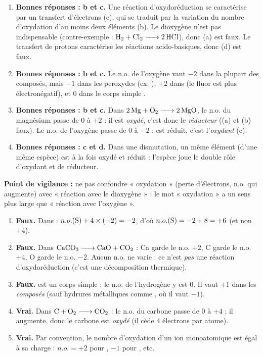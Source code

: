 \documentclass[11pt]{article}
\newcommand{\cle}[1]{{\popxbold\color{popdark}#1}}
\begin{document}
\begin{corrige}
\begin{enumerate}
\item \textbf{Bonnes réponses : b et c.} Une réaction d'oxydoréduction se caractérise par un \cle{transfert d'électrons} (c), qui se traduit par la variation du nombre d'oxydation d'au moins deux éléments (b). Le dioxygène n'est pas indispensable (contre-exemple : $\ce{H2 + Cl2 -> 2 HCl}$), donc (a) est faux. Le transfert de protons  caractérise les réactions acido-basiques, donc (d) est faux.
\item \textbf{Bonnes réponses : b et c.} Le n.o. de l'oxygène vaut $-2$ dans la plupart des composés, mais $-1$ dans les peroxydes (ex. ), $+2$ dans  (le fluor est plus électronégatif), et $0$ dans le corps simple .
\item \textbf{Bonnes réponses : b et c.} Dans $\ce{2 Mg + O2 -> 2 MgO}$, le n.o. du magnésium passe de $0$ à $+2$ : il est \emph{oxydé}, c'est donc le \emph{réducteur} ((a) et (b) faux). Le n.o. de l'oxygène passe de $0$ à $-2$ :  est réduit, c'est l'\emph{oxydant} (c).
\item \textbf{Bonnes réponses : c et d.} Dans une \cle{dismutation}, un même élément (d'une même espèce) est à la fois oxydé et réduit : l'espèce joue le double rôle d'oxydant et de réducteur.
\end{enumerate}
\textbf{Point de vigilance :} ne pas confondre « oxydation » (perte d'électrons, n.o. qui augmente) avec « réaction avec le dioxygène » : le mot « oxydation » a un sens plus large que « réaction avec l'oxygène ».
\end{corrige}

\begin{corrige}
\begin{enumerate}
\item \textbf{Faux.} Dans  : $n.o.(\ce{S}) + 4 \times (-2) = -2$, d'où $n.o.(\ce{S}) = -2 + 8 = +6$ (et non $+4$).
\item \textbf{Faux.} Dans $\ce{CaCO3 -> CaO + CO2}$ : Ca garde le n.o. $+2$, C garde le n.o. $+4$, O garde le n.o. $-2$. Aucun n.o. ne varie : ce n'est \emph{pas} une réaction d'oxydoréduction (c'est une décomposition thermique).
\item \textbf{Faux.}  est un corps simple : le n.o. de l'hydrogène y est $0$. Il vaut $+1$ dans les \emph{composés} (sauf hydrures métalliques comme , où il vaut $-1$).
\item \textbf{Vrai.} Dans $\ce{C + O2 -> CO2}$ : le n.o. du carbone passe de $0$ à $+4$ ; il augmente, donc le carbone est \emph{oxydé} (il cède 4 électrons par atome).
\item \textbf{Vrai.} Par convention, le nombre d'oxydation d'un ion monoatomique est égal à sa charge : $n.o. = +2$ pour , $-1$ pour , etc.
\end{enumerate}
\end{corrige}
\end{document}
